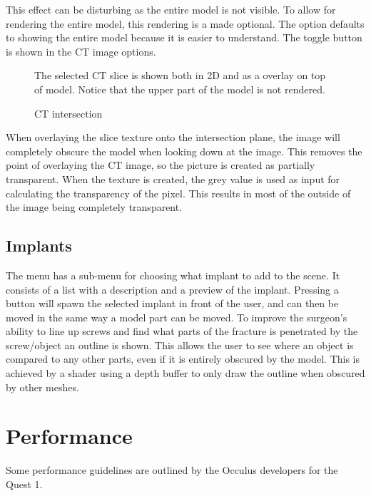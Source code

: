 \documentclass[a4paper]{report}
\begin{document}
This effect can be disturbing as the entire model is not visible. To allow for rendering the entire model, this rendering is a made optional. The option defaults to showing the entire model because it is easier to understand.
The toggle button is shown in the CT image options.

\begin{figure}[h!]
    \centering
	\hfill
  \caption{CT intersection}
  \small
  The selected CT slice is shown both in 2D and as a overlay on top of model. Notice that the upper part of the model is not rendered.
\end{figure}

When overlaying the slice texture onto the intersection plane, the image will completely obscure the model when looking down at the image. This removes the point of overlaying the CT image, so the picture is created as partially transparent. When the texture is created, the grey value is used as input for calculating the transparency of the pixel. This results in most of the outside of the image being completely transparent.

\subsection{Implants}
The menu has a sub-menu for choosing what implant to add to the scene. It consists of a list with a description and a preview of the implant. Pressing a button will spawn the selected implant in front of the user, and can then be moved in the same way a model part can be moved.
To improve the surgeon's ability to line up screws and find what parts of the fracture is penetrated by the screw/object an outline is shown. This allows the user to see where an object is compared to any other parts, even if it is entirely obscured by the model. This is achieved by a shader using a depth buffer to only draw the outline when obscured by other meshes\cite{shader depth}.

\section{Performance}
Some performance guidelines are outlined by the Occulus developers for the Quest 1\cite{performance}.
\end{document}
